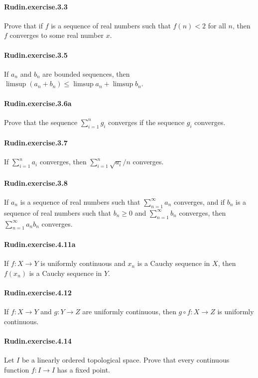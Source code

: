 \documentclass{article}
\begin{document}
\paragraph{Rudin.exercise.3.3} Prove that if $f$ is a sequence of real numbers such that $f(n)<2$ for all $n$, then $f$ converges to some real number $x$.

\paragraph{Rudin.exercise.3.5} If $a_n$ and $b_n$ are bounded sequences, then $\limsup(a_n+b_n)\leq \limsup a_n + \limsup b_n$.

\paragraph{Rudin.exercise.3.6a} Prove that the sequence $\sum_{i=1}^n g_i$ converges if the sequence $g_i$ converges.

\paragraph{Rudin.exercise.3.7} If $\sum_{i=1}^n a_i$ converges, then $\sum_{i=1}^n \sqrt{a_i}/n$ converges.

\paragraph{Rudin.exercise.3.8} If $a_n$ is a sequence of real numbers such that $\sum_{n=1}^\infty a_n$ converges, and if $b_n$ is a sequence of real numbers such that $b_n\geq 0$ and $\sum_{n=1}^\infty b_n$ converges, then $\sum_{n=1}^\infty a_nb_n$ converges.

\paragraph{Rudin.exercise.4.11a} If $f:X\to Y$ is uniformly continuous and $x_n$ is a Cauchy sequence in $X$, then $f(x_n)$ is a Cauchy sequence in $Y$.

\paragraph{Rudin.exercise.4.12} If $f:X\to Y$ and $g:Y\to Z$ are uniformly continuous, then $g\circ f:X\to Z$ is uniformly continuous.

\paragraph{Rudin.exercise.4.14} Let $I$ be a linearly ordered topological space. Prove that every continuous function $f:I\to I$ has a fixed point.
\end{document}
